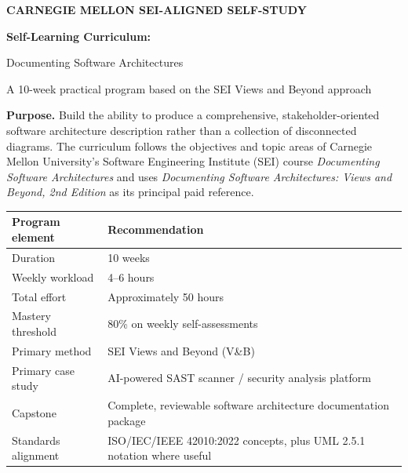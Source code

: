 \documentclass[10pt,letterpaper]{article}
\begin{document}
\thispagestyle{empty}
\begin{tcolorbox}[
  enhanced,
  colback=Navy,
  colframe=Navy,
  boxrule=0pt,
  arc=3pt,
  left=18pt,right=18pt,top=18pt,bottom=18pt]
{\color{white}\small\bfseries CARNEGIE MELLON SEI-ALIGNED SELF-STUDY}\par
\vspace{0.35em}
{\color{white}\fontsize{25}{29}\selectfont\bfseries Self-Learning Curriculum:\par
Documenting Software Architectures}\par
\vspace{0.55em}
{\color{white!82}\large A 10-week practical program based on the SEI Views and Beyond approach}
\end{tcolorbox}

\vspace{1.1em}
\begin{keybox}
\textbf{Purpose.} Build the ability to produce a comprehensive, stakeholder-oriented software architecture description rather than a collection of disconnected diagrams. The curriculum follows the objectives and topic areas of Carnegie Mellon University's Software Engineering Institute (SEI) course \emph{Documenting Software Architectures} and uses \emph{Documenting Software Architectures: Views and Beyond, 2nd Edition} as its principal paid reference.
\end{keybox}

\vspace{1.0em}
\begin{tabularx}{\textwidth}{@{}P{0.23\textwidth}Y@{}}
\toprule
{}\textbf{Program element} & \textbf{Recommendation} \\
\midrule
Duration & 10 weeks \\
Weekly workload & 4--6 hours \\
Total effort & Approximately 50 hours \\
Mastery threshold & 80\% on weekly self-assessments \\
Primary method & SEI Views and Beyond (V\&B) \\
Primary case study & AI-powered SAST scanner / security analysis platform \\
Capstone & Complete, reviewable software architecture documentation package \\
Standards alignment & ISO/IEC/IEEE 42010:2022 concepts, plus UML 2.5.1 notation where useful \\
\bottomrule
\end{tabularx}
\end{document}
